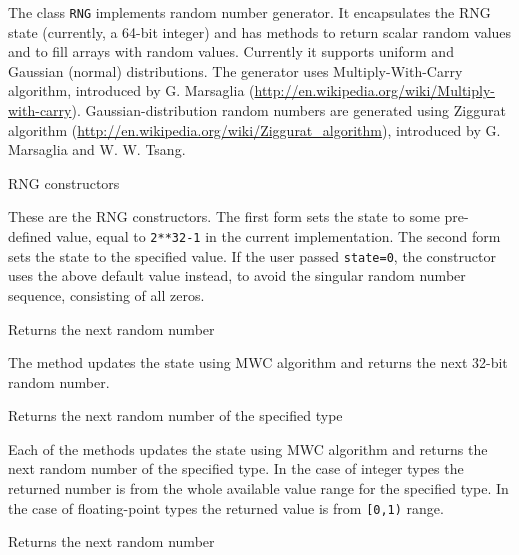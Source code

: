 The class \texttt{RNG} implements random number generator. It encapsulates the RNG state (currently, a 64-bit integer) and  has methods to return scalar random values and to fill arrays with random values. Currently it supports uniform and Gaussian (normal) distributions. The generator uses Multiply-With-Carry algorithm, introduced by G. Marsaglia (\url{http://en.wikipedia.org/wiki/Multiply-with-carry}). Gaussian-distribution random numbers are generated using Ziggurat algorithm (\url{http://en.wikipedia.org/wiki/Ziggurat_algorithm}), introduced by G. Marsaglia and W. W. Tsang. 

RNG constructors

\begin{description}
\end{description}

These are the RNG constructors. The first form sets the state to some pre-defined value, equal to \texttt{2**32-1} in the current implementation. The second form sets the state to the specified value. If the user passed \texttt{state=0}, the constructor uses the above default value instead, to avoid the singular random number sequence, consisting of all zeros.

Returns the next random number


The method updates the state using MWC algorithm and returns the next 32-bit random number.


Returns the next random number of the specified type


Each of the methods updates the state using MWC algorithm and returns the next random number of the specified type. In the case of integer types the returned number is from the whole available value range for the specified type. In the case of floating-point types the returned value is from \texttt{[0,1)} range.

Returns the next random number

\begin{description}
\end{description}

